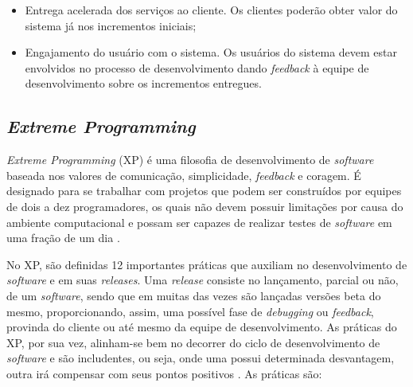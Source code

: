 \begin{itemize}
    \item Entrega acelerada dos serviços ao cliente. Os clientes poderão obter valor do sistema já nos incrementos iniciais;
    \item Engajamento do usuário com o sistema. Os usuários do sistema devem estar envolvidos no processo
    de desenvolvimento dando \textit{feedback} à equipe de desenvolvimento sobre os incrementos entregues.
\end{itemize}

    \subsection{\textit{Extreme Programming}}
    \textit{Extreme Programming} (XP) é uma filosofia de desenvolvimento de \textit{software} baseada nos valores de comunicação, simplicidade, \textit{feedback} e coragem. É designado para se trabalhar com projetos que podem ser
    construídos por equipes de dois a dez programadores, os quais não devem possuir limitações
    por causa do ambiente computacional e possam ser capazes de realizar testes de
    \textit{software} em uma fração de um dia \cite{beck_2004}.

    No XP, são definidas 12 importantes práticas que auxiliam no
    desenvolvimento de \textit{software} e em suas \textit{releases}.
    Uma \textit{release} consiste no lançamento, parcial ou não,
    de um \textit{software}, sendo que em muitas das vezes são
    lançadas versões beta do mesmo, proporcionando, assim, uma possível
    fase de \textit{debugging} ou \textit{feedback}, provinda do
    cliente ou até mesmo da equipe de desenvolvimento. As práticas do XP, por sua vez, alinham-se bem no decorrer do ciclo de desenvolvimento de \textit{software} e são includentes, ou seja, onde uma possui determinada desvantagem, outra
    irá compensar com seus pontos positivos \cite{beck_2004}. As práticas são:

